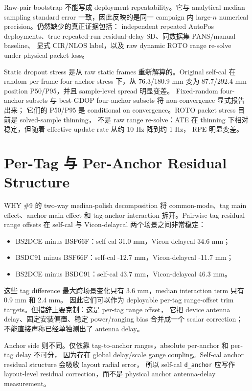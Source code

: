 \documentclass[UTF8,11pt,a4paper]{ctexart}
\newcommand{\case}[1]{\texttt{#1}}
\begin{document}
Raw-pair bootstrap 不能写成 deployment repeatability。它与 analytical median sampling standard error
一致，因此反映的是同一 campaign 内 large-\(n\) numerical precision。仍然缺少的真正证据包括：
independent repeated AutoPos deployments、true repeated-run residual-delay SD、同数据集 PANS/manual baseline、
显式 CIR/NLOS label，以及 raw dynamic ROTO range re-solve under physical packet loss。

Static dropout stress 是从 raw static frames 重新解算的。Original self-cal 在 random per-frame four-anchor
stress 下，从 76.3/180.9 mm 变为 87.7/292.4 mm position P50/P95，并且 sample-level spread 明显变差。
Fixed-random four-anchor subsets 与 best-GDOP four-anchor subsets 将 non-convergence 显式报告出来；
它们的 P50/P95 是 conditional on convergence。ROTO packet stress 目前是 solved-sample thinning，
不是 raw range re-solve：ATE 在 thinning 下相对稳定，但随着 effective update rate 从约 10 Hz 降到约 1 Hz，
RPE 明显变差。

\section{Per-Tag 与 Per-Anchor Residual Structure}

WHY \#9 的 two-way median-polish decomposition 将 common-mode、tag main effect、anchor main effect
和 tag-anchor interaction 拆开。Pairwise tag residual range offsets 在 self-cal 与 Vicon-delaycal
两个场景之间非常稳定：
\begin{itemize}
    \item BS2DCE minus BSF66F：self-cal 31.0 mm，Vicon-delaycal 34.6 mm；
    \item BSDC91 minus BSF66F：self-cal -12.7 mm，Vicon-delaycal -11.7 mm；
    \item BS2DCE minus BSDC91：self-cal 43.7 mm，Vicon-delaycal 46.3 mm。
\end{itemize}
这些 tag difference 最大跨场景变化只有 3.6 mm，median interaction term 只有 0.9 mm 和 2.4 mm。
因此它们可以作为 deployable per-tag range-offset trim targets。但措辞上要克制：这是 per-tag range offset，
它把 device antenna delay、固定安装偏置、稳定 power/ranging bias 合并成一个 scalar correction；
不能直接声称已经单独测出了 antenna delay。

Anchor side 则不同。仅依靠 tag-to-anchor ranges，absolute per-anchor 和 per-tag delay 不可分，
因为存在 global delay/scale gauge coupling。Self-cal anchor residual structure 会吸收 layout radial error，
所以 self-cal \case{d\_anchor} 应写作 layout-level residual correction，而不是 physical anchor antenna-delay measurement。
\end{document}
